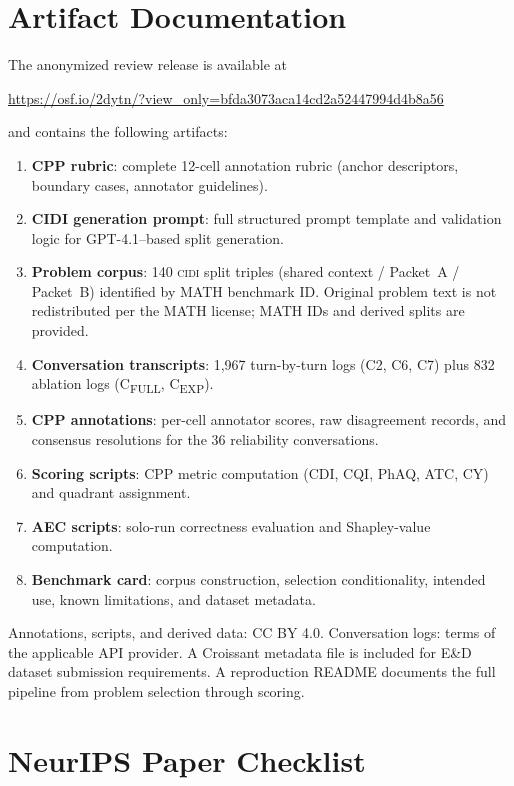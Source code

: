 \documentclass{article}
\newcommand{\CIDI}{\textsc{cidi}}
\begin{document}
\section{Artifact Documentation}
\label{app:artifacts}

The anonymized review release is available at
\begin{sloppypar}\noindent\url{https://osf.io/2dytn/?view_only=bfda3073aca14cd2a52447994d4b8a56}\end{sloppypar}
and contains the following artifacts:
\begin{enumerate}
  \item \textbf{CPP rubric}: complete 12-cell annotation rubric (anchor
  descriptors, boundary cases, annotator guidelines).
  \item \textbf{CIDI generation prompt}: full structured prompt template
  and validation logic for GPT-4.1--based split generation.
  \item \textbf{Problem corpus}: 140 \CIDI{} split triples (shared
  context / Packet~A / Packet~B) identified by MATH benchmark ID.
  Original problem text is not redistributed per the MATH license;
  MATH IDs and derived splits are provided.
  \item \textbf{Conversation transcripts}: 1,967 turn-by-turn logs
  (C2, C6, C7) plus 832 ablation logs (C\textsubscript{FULL},
  C\textsubscript{EXP}).
  \item \textbf{CPP annotations}: per-cell annotator scores, raw
  disagreement records, and consensus resolutions for the 36 reliability
  conversations.
  \item \textbf{Scoring scripts}: CPP metric computation (CDI, CQI,
  PhAQ, ATC, CY) and quadrant assignment.
  \item \textbf{AEC scripts}: solo-run correctness evaluation and
  Shapley-value computation.
  \item \textbf{Benchmark card}: corpus construction, selection
  conditionality, intended use, known limitations, and dataset metadata.
\end{enumerate}
Annotations, scripts, and derived data: CC BY 4.0.
Conversation logs: terms of the applicable API provider.
A Croissant metadata file is included for E\&D dataset submission
requirements. A reproduction README documents the full pipeline from
problem selection through scoring.

\section*{NeurIPS Paper Checklist}
\end{document}
